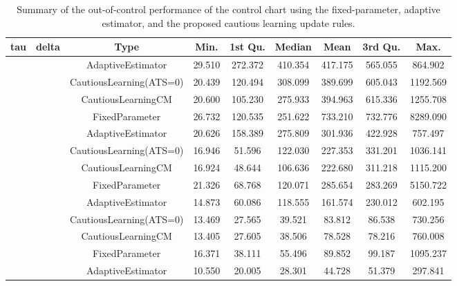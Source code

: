 \begin{table}[!h]

\caption{Summary of the out-of-control performance of the control chart using the fixed-parameter, adaptive estimator, and the proposed cautious learning update rules.}
\centering
\begin{tabular}[t]{ccccccccc}
\toprule
tau & delta & Type & Min. & 1st Qu. & Median & Mean & 3rd Qu. & Max.\\
\midrule
 &  & AdaptiveEstimator & 29.510 & 272.372 & 410.354 & 417.175 & 565.055 & 864.902\\

 &  & CautiousLearning(ATS=0) & 20.439 & 120.494 & 308.099 & 389.699 & 605.043 & 1192.569\\

 &  & CautiousLearningCM & 20.600 & 105.230 & 275.933 & 394.963 & 615.336 & 1255.708\\

 & \multirow[t]{-4}{*}{\centering\arraybackslash 0.25} & FixedParameter & 26.732 & 120.535 & 251.622 & 733.210 & 732.776 & 8289.090\\
\cmidrule{2-9}
 &  & AdaptiveEstimator & 20.626 & 158.389 & 275.809 & 301.936 & 422.928 & 757.497\\

 &  & CautiousLearning(ATS=0) & 16.946 & 51.596 & 122.030 & 227.353 & 331.201 & 1036.141\\

 &  & CautiousLearningCM & 16.924 & 48.644 & 106.636 & 222.680 & 311.218 & 1115.200\\

 & \multirow[t]{-4}{*}{\centering\arraybackslash 0.35} & FixedParameter & 21.326 & 68.768 & 120.071 & 285.654 & 283.269 & 5150.722\\
\cmidrule{2-9}
 &  & AdaptiveEstimator & 14.873 & 60.086 & 118.555 & 161.574 & 230.012 & 602.195\\

 &  & CautiousLearning(ATS=0) & 13.469 & 27.565 & 39.521 & 83.812 & 86.538 & 730.256\\

 &  & CautiousLearningCM & 13.405 & 27.605 & 38.506 & 78.528 & 78.216 & 760.008\\

 & \multirow[t]{-4}{*}{\centering\arraybackslash 0.50} & FixedParameter & 16.371 & 38.111 & 55.496 & 89.852 & 99.187 & 1095.237\\
\cmidrule{2-9}
 &  & AdaptiveEstimator & 10.550 & 20.005 & 28.301 & 44.728 & 51.379 & 297.841\\


\end{tabular}
\end{table}
